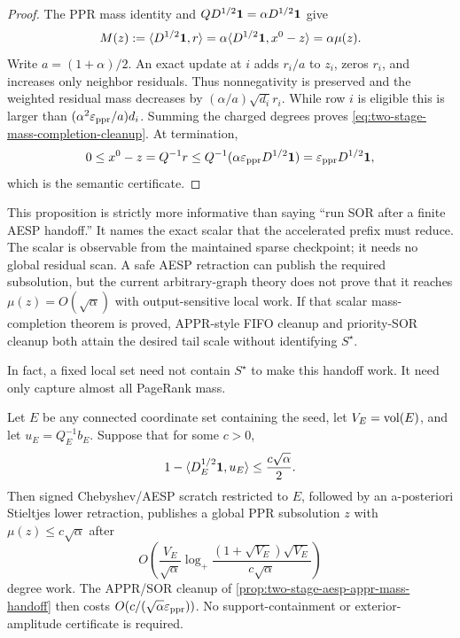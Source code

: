 \begin{proof}
The PPR mass identity and $QD^{1/2}\mathbf{1}=\alpha D^{1/2}\mathbf{1}$ give
\begin{equation*}
 M(z):=\langle D^{1/2}\mathbf{1},r\rangle
 =\alpha\langle D^{1/2}\mathbf{1},x^0-z\rangle
 =\alpha\mu(z).
\end{equation*}
Write $a=(1+\alpha)/2$.  An exact update at $i$ adds $r_i/a$ to $z_i$,
zeros $r_i$, and increases only neighbor residuals.  Thus nonnegativity is
preserved and the weighted residual mass decreases by
$(\alpha/a)\sqrt{d_i}r_i$.  While row $i$ is eligible this is larger than
$(\alpha^2\varepsilon_{\mathrm{ppr}}/a)d_i$.  Summing the charged degrees proves
\cref{eq:two-stage-mass-completion-cleanup}.  At termination,
\begin{equation*}
 0\leq x^0-z=Q^{-1}r
 \leq Q^{-1}(\alpha\varepsilon_{\mathrm{ppr}} D^{1/2}\mathbf{1})
 =\varepsilon_{\mathrm{ppr}} D^{1/2}\mathbf{1},
\end{equation*}
which is the semantic certificate.
\end{proof}

This proposition is strictly more informative than saying ``run SOR after a
finite AESP handoff.''  It names the exact scalar that the accelerated prefix
must reduce.  The scalar is observable from the maintained sparse checkpoint;
it needs no global residual scan.  A safe AESP retraction can publish the
required subsolution, but
the current arbitrary-graph theory does not prove that it reaches
$\mu(z)=O(\sqrt\alpha)$ with output-sensitive local work.  If that scalar
mass-completion theorem is proved, APPR-style FIFO cleanup and priority-SOR
cleanup both attain the desired tail scale without identifying $S^\star$.

In fact, a fixed local set need not contain $S^\star$ to make this handoff
work.  It need only capture almost all PageRank mass.

\begin{theorem}
\label{thm:two-stage-mass-capturing-envelope}
Let $E$ be any connected coordinate set containing the seed, let
$V_E=\operatorname{vol}(E)$, and let $u_E=Q_E^{-1}b_E$.  Suppose that for some $c>0$,
\begin{equation}
 1-\langle D_E^{1/2}\mathbf{1},u_E\rangle
 \leq\frac{c\sqrt\alpha}{2}.
 \label{eq:two-stage-mass-capturing-envelope}
\end{equation}
Then signed Chebyshev/AESP scratch restricted to $E$, followed by an
a-posteriori Stieltjes lower retraction, publishes a global PPR subsolution
$z$ with $\mu(z)\leq c\sqrt\alpha$ after
\begin{equation}
 O\!\left(\frac{V_E}{\sqrt\alpha}
   \log_+\frac{(1+\sqrt{V_E})\sqrt{V_E}}
                    {c\sqrt\alpha}\right)
 \label{eq:two-stage-mass-capture-work}
\end{equation}
degree work.  The APPR/SOR cleanup of
\cref{prop:two-stage-aesp-appr-mass-handoff} then costs
$O(c/(\sqrt\alpha\varepsilon_{\mathrm{ppr}}))$.  No support-containment or exterior-amplitude
certificate is required.
\end{theorem}

